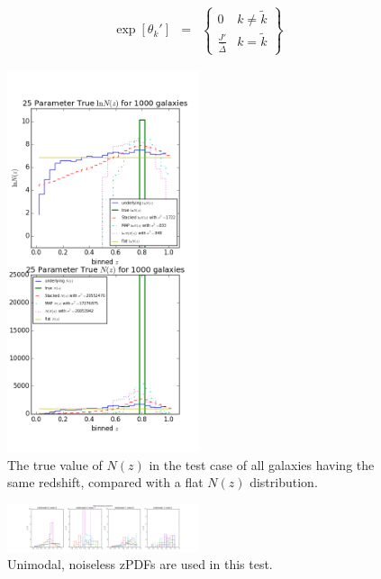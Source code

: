 \documentclass[preprint]{aastex}
\begin{document}
\begin{eqnarray}
\label{eq:faketheta}
\exp[\theta_{k}'] &=& \left\{\begin{array}{cc}0&k\neq\tilde{k}\\ \frac{J'}{\bar{\Delta}}&k=\tilde{k}\end{array}\right\}
\end{eqnarray}

\begin{figure}
\includegraphics[width=0.5\textwidth]{trueNz-toy.png}
\caption{The true value of $N(z)$ in the test case of all galaxies having the same redshift, compared with a flat $N(z)$ distribution.}
\label{fig:deltatrueNz}
\end{figure}

\begin{figure}
\includegraphics[width=0.5\textwidth]{samplepzs-toy.png}
\caption{Unimodal, noiseless zPDFs are used in this test.}
\label{fig:toypzs}
\end{figure}
\end{document}
